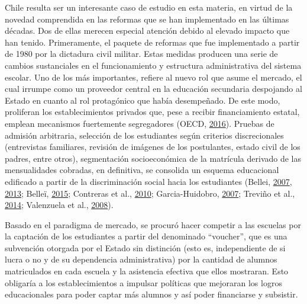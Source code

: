 \documentclass[
]{article}
\begin{document}
Chile resulta ser un interesante caso de estudio en esta materia, en
virtud de la novedad comprendida en las reformas que se han implementado
en las últimas décadas. Dos de ellas merecen especial atención debido al
elevado impacto que han tenido. Primeramente, el paquete de reformas que
fue implementado a partir de 1980 por la dictadura civil militar. Estas
medidas producen una serie de cambios sustanciales en el funcionamiento
y estructura administrativa del sistema escolar. Uno de los más
importantes, refiere al nuevo rol que asume el mercado, el cual irrumpe
como un proveedor central en la educación secundaria despojando al
Estado en cuanto al rol protagónico que había desempeñado. De este modo,
proliferan los establecimientos privados que, pese a recibir
financiamiento estatal, emplean mecanismos fuertemente segregadores
(OECD, \protect\hyperlink{ref-oecd_pisa_2016}{2016}). Pruebas de
admisión arbitraria, selección de los estudiantes según criterios
discrecionales (entrevistas familiares, revisión de imágenes de los
postulantes, estado civil de los padres, entre otros), segmentación
socioeconómica de la matrícula derivado de las mensualidades cobradas,
en definitiva, se consolida un esquema educacional edificado a partir de
la discriminación social hacia los estudiantes (Bellei,
\protect\hyperlink{ref-bellei_expansion_2007}{2007},
\protect\hyperlink{ref-bellei_estudio_2013}{2013}; Belleï,
\protect\hyperlink{ref-bellei_gran_2015}{2015}; Contreras et al.,
\protect\hyperlink{ref-contreras_when_2010}{2010}; Garcia-Huidobro,
\protect\hyperlink{ref-garcia-huidobro_desigualdad_2007}{2007}; Treviño
et al., \protect\hyperlink{ref-trevino_segregacion_2014}{2014};
Valenzuela et al.,
\protect\hyperlink{ref-valenzuela_evolucion_2008}{2008}).

Basado en el paradigma de mercado, se procuró hacer competir a las
escuelas por la captación de los estudiantes a partir del denominado
``voucher'', que es una subvención otorgada por el Estado sin distinción
(esto es, independiente de si lucra o no y de su dependencia
administrativa) por la cantidad de alumnos matriculados en cada escuela
y la asistencia efectiva que ellos mostraran. Esto obligaría a los
establecimientos a impulsar políticas que mejoraran los logros
educacionales para poder captar más alumnos y así poder financiarse y
subsistir.
\end{document}
